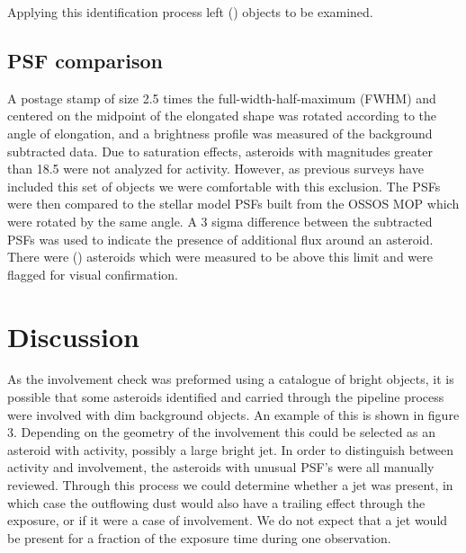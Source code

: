 \documentclass[iop,apj]{emulateapj}
\begin{document}
Applying this identification process left () objects to be examined.


\subsection{PSF comparison}

A postage stamp of size 2.5 times the full-width-half-maximum (FWHM) and centered on the midpoint of the elongated shape was rotated according to the angle of elongation, and a brightness profile was measured of the background subtracted data. Due to saturation effects, asteroids with magnitudes greater than 18.5 were not analyzed for activity. However, as previous surveys have included this set of objects \cite{} we were comfortable with this exclusion. The PSFs were then compared to the stellar model PSFs built from the OSSOS MOP \citep{ossos} which were rotated by the same angle. A 3 sigma difference between the subtracted PSFs was used to indicate the presence of additional flux around an asteroid. There were () asteroids which were measured to be above this limit and were flagged for visual confirmation. 

\section{Discussion}

As the involvement check was preformed using a catalogue of bright objects, it is possible that some asteroids identified and carried through the pipeline process were involved with dim background objects. An example of this is shown in figure 3. Depending on the geometry of the involvement this could be selected as an asteroid with activity, possibly a large bright jet. In order to distinguish between activity and involvement, the asteroids with unusual PSF's were all manually reviewed. Through this process we could determine whether a jet was present, in which case the outflowing dust would also have a trailing effect through the exposure, or if it were a case of involvement. We do not expect that a jet would be present for a fraction of the exposure time during one observation. 





\end{document}
